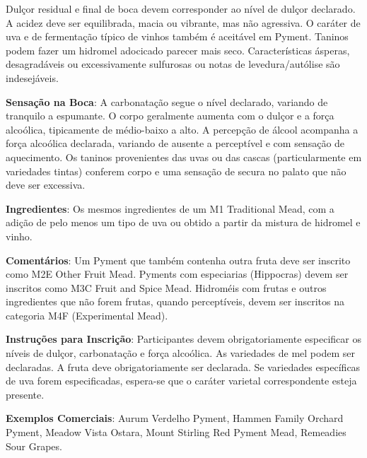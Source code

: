 Dulçor residual e final de boca devem corresponder ao nível de dulçor declarado. A acidez deve ser equilibrada, macia ou vibrante, mas não agressiva. O caráter de uva e de fermentação típico de vinhos também é aceitável em Pyment. Taninos podem fazer um hidromel adocicado parecer mais seco. Características ásperas, desagradáveis ou excessivamente sulfurosas ou notas de levedura/autólise são indesejáveis.

\textbf{Sensação na Boca}: A carbonatação segue o nível declarado, variando de tranquilo a espumante. O corpo geralmente aumenta com o dulçor e a força alcoólica, tipicamente de médio-baixo a alto. A percepção de álcool acompanha a força alcoólica declarada, variando de ausente a perceptível e com sensação de aquecimento. Os taninos provenientes das uvas ou das cascas (particularmente em variedades tintas) conferem corpo e uma sensação de secura no palato que não deve ser excessiva.

\textbf{Ingredientes}: Os mesmos ingredientes de um M1 Traditional Mead, com a adição de pelo menos um tipo de uva ou obtido a partir da mistura de hidromel e vinho.

\textbf{Comentários}: Um Pyment que também contenha outra fruta deve ser inscrito como M2E Other Fruit Mead. Pyments com especiarias (Hippocras) devem ser inscritos como M3C Fruit and Spice Mead. Hidroméis com frutas e outros ingredientes que não forem frutas, quando perceptíveis, devem ser inscritos na categoria M4F (Experimental Mead).

\textbf{Instruções para Inscrição}: Participantes devem obrigatoriamente especificar os níveis de dulçor, carbonatação e força alcoólica. As variedades de mel podem ser declaradas. A fruta deve obrigatoriamente ser declarada. Se variedades específicas de uva forem especificadas, espera-se que o caráter varietal correspondente esteja presente.

\textbf{Exemplos Comerciais}: Aurum Verdelho Pyment, Hammen Family Orchard Pyment, Meadow Vista Ostara, Mount Stirling Red Pyment Mead, Remeadies Sour Grapes.

